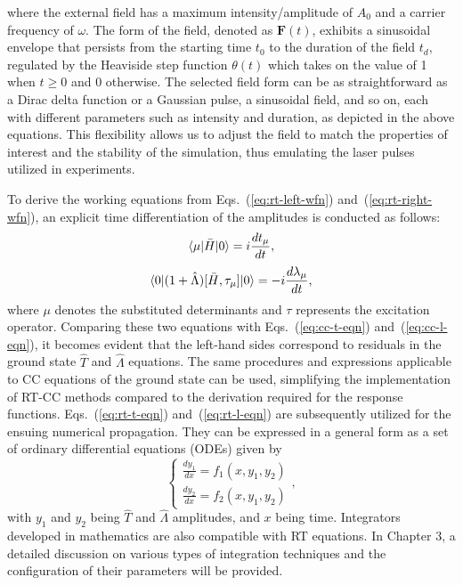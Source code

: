 where the external field has a maximum intensity/amplitude of $A_{0}$ and a carrier frequency of $\omega$. The form of the field, denoted as $\textbf{F}(t)$, exhibits a sinusoidal envelope that persists from the starting time $t_{0}$ to the duration of the field $t_{d}$, regulated by the Heaviside step function $\theta(t)$ which takes on the value of 1 when $t \ge 0$ and 0 otherwise. The selected field form can be as straightforward as a Dirac delta function\cite{Dirac1927function, Morse1951} or a Gaussian pulse, a sinusoidal field, and so on, each with different parameters such as intensity and duration, as depicted in the above equations. This flexibility allows us to adjust the field to match the properties of interest and the stability of the simulation, thus emulating the laser pulses utilized in experiments.

To derive the working equations from Eqs.~(\ref{eq:rt-left-wfn}) and~(\ref{eq:rt-right-wfn}), an explicit time differentiation of the amplitudes is conducted as follows: 
\begin{equation}
\langle\mu |\bar{H}| 0 \rangle=i\frac{dt_{\mu}}{dt},
\label{eq:rt-t-eqn}
\end{equation}
\begin{equation}
\langle0 |(1 + \hat{\Lambda})[\bar{H}, \tau_{\mu}]| 0 \rangle = -i\frac{d\lambda_{\mu}}{dt},
\label{eq:rt-l-eqn}
\end{equation}
where $\mu$ denotes the substituted determinants and $\tau$ represents the excitation operator. Comparing these two equations with Eqs.~(\ref{eq:cc-t-eqn}) and~(\ref{eq:cc-l-eqn}), it becomes evident that the left-hand sides correspond to residuals in the ground state $\hat{T}$ and $\hat{\Lambda}$ equations. The same procedures and expressions applicable to CC equations of the ground state can be used, simplifying the implementation of RT-CC methods compared to the derivation required for the response functions. Eqs.~(\ref{eq:rt-t-eqn}) and~(\ref{eq:rt-l-eqn}) are subsequently utilized for the ensuing numerical propagation. They can be expressed in a general form as a set of ordinary differential equations (ODEs) given by 
\begin{equation}
\begin{cases}
\frac{dy_{1}}{dx}=f_{1}(x, y_{1} , y_{2})\\
\frac{dy_{2}}{dx}=f_{2}(x, y_{1} , y_{2})
\end{cases},
\end{equation}
with $y_{1}$ and $y_{2}$ being $\hat{T}$ and $\hat{\Lambda}$ amplitudes, and $x$ being time. Integrators developed in mathematics are also compatible with RT equations. In Chapter 3, a detailed discussion on various types of integration techniques and the configuration of their parameters will be provided.

